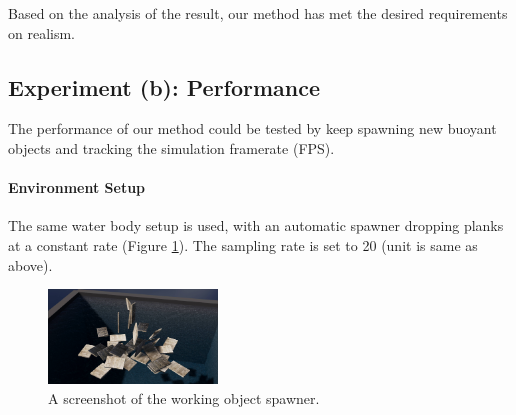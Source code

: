 Based on the analysis of the result, our method has met the desired requirements on realism.

\subsection*{Experiment (b): Performance}

The performance of our method could be tested by keep spawning new buoyant objects and tracking the simulation framerate (FPS).

\paragraph*{Environment Setup}

The same water body setup is used, with an automatic spawner dropping planks at a constant rate (Figure \ref{spawner-setup}).
The sampling rate is set to 20 (unit is same as above).

\begin{figure}[h]
	\centering
	\includegraphics[width=0.4\textwidth]{../Thesis/figures/spawner-setup.jpg}
	\caption{A screenshot of the working object spawner.}
	\label{spawner-setup}
\end{figure}

